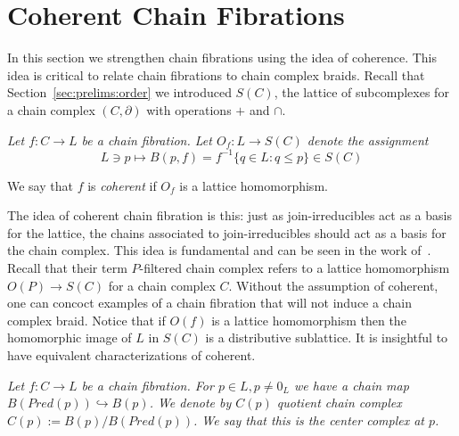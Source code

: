 \section{Coherent Chain Fibrations}

In this section we strengthen chain fibrations using the idea of coherence.  This idea is critical to relate chain fibrations to chain complex braids.  Recall that Section~\ref{sec:prelims:order} we introduced $S(C)$, the lattice of subcomplexes for a chain complex $(C,\partial)$ with operations $+$ and $\cap$. 

\begin{defn}\label{def:coherent}
{\em
Let $f:C\to L$ be a chain fibration.  Let $O_f:L\to S(C)$ denote the assignment $$L\ni p\mapsto B(p,f)= f^{-1}\{q\in L: q\leq p\}\in S(C)$$

We say that $f$ is {\em coherent} if $O_f$ is a lattice homomorphism.
}
\end{defn}

The idea of coherent chain fibration is this: just as join-irreducibles act as a basis for the lattice, the chains associated to join-irreducibles should act as a basis for the chain complex. This idea is fundamental and can be seen in the work of~\cite{salamon}.  Recall that their term $P$-filtered chain complex refers to a lattice homomorphism $O(P)\to S(C)$ for a chain complex $C$.  Without the assumption of coherent, one can concoct examples of a chain fibration that will not induce a chain complex braid.  Notice that if $O(f)$ is a lattice homomorphism then the homomorphic image of $L$ in $S(C)$ is a distributive sublattice.  It is insightful to have equivalent characterizations of coherent.  


\begin{defn}
{\em
Let $f:C\to L$ be a chain fibration. For $p\in L, p\neq 0_L$ we have a chain map $B(Pred(p))\hookrightarrow B(p)$.   We denote by $C(p)$ quotient chain complex $C(p):= B(p)/B(Pred(p))$.  We say that this is the {\em center complex at $p$}.
}
\end{defn}





